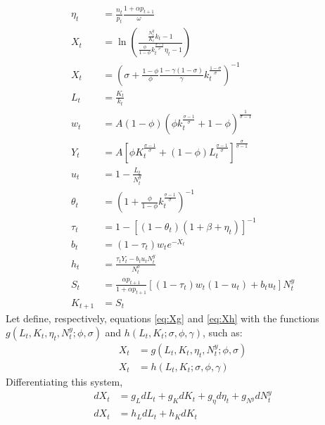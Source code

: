 \begin{align}
\eta_t &= \frac{n_t}{p_t}\frac{1+\alpha p_{t+1}}{\omega} \tag{Pub. $\eta$} \\
X_t &= \ln\left( \frac{ \frac{N_t^y}{K_t} k_t - 1 } { \frac{\phi}{1-\phi} k_t^{\frac{\sigma-1}{\sigma}} \eta_t - 1 }\right) \tag{Eq. $g$} \\
X_t &= \left( \sigma + \frac{1-\phi}{\phi} \frac{1-\gamma(1-\sigma)}{\gamma} k_t^{\frac{1-\sigma}{\sigma}} \right)^{-1} \tag{Eq. h}\\
L_t &= \frac{K_t}{k_t} \tag{Prod. $L$} \\
w_t &= A(1-\phi)\left( \phi k_t^\frac{\sigma-1}{\sigma} + 1-\phi \right)^\frac{1}{\sigma-1} \tag{Prod. $w$}\\
Y_t &= A \left[ \phi K_t^\frac{\sigma-1}{\sigma} + (1-\phi) L_t^\frac{\sigma-1}{\sigma} \right]^\frac{\sigma}{\sigma-1} \tag{Prod. $Y$}\\
u_t &= 1 - \frac{L_t}{N_t^y} \tag{Prod. $u$}\\
\theta_t &= \left(1 + \frac{\phi}{1-\phi} k_t^\frac{\sigma-1}{\sigma} \right)^{-1} \tag{Prod. $\theta$} \\
\tau_t &= 1 - \left[ (1-\theta_t)(1+\beta+\eta_t) \right]^{-1} \tag{Pub. $\tau$}\\
b_t &= (1-\tau_t) w_t e^{-X_t} \tag{Pub. $b$}\\
h_t &= \frac{\tau_t Y_t - b_t u_t N_t^y}{N_t^o} \tag{Pub. $h$}\\
S_t &= \frac{\alpha p_{t+1}}{1 + \alpha p_{t+1}} \left[ (1-\tau_t)w_t(1-u_t) + b_tu_t \right] N_t^y \tag{HH. $S$}  \\
K_{t+1} &= S_t	\tag{HH. $K$}
\end{align}
Let define, respectively, equations \eqref{eq:Xg} and \eqref{eq:Xh} with the functions $g(L_t, K_t, \eta_t, N_t^y; \phi, \sigma)$ and $h(L_t, K_t; \sigma, \phi, \gamma)$, such as:
\begin{align*}
	X_t &= g(L_t, K_t, \eta_t, N_t^y; \phi, \sigma) 
	\\
	X_t &= h(L_t, K_t; \sigma, \phi, \gamma) 
\end{align*}
Differentiating this system,
\begin{align*}
	dX_t &= g_L dL_t + g_K dK_t + g_\eta d\eta_t + g_{N^y} dN_t^y \\
	dX_t &= h_L dL_t + h_K dK_t
\end{align*}
